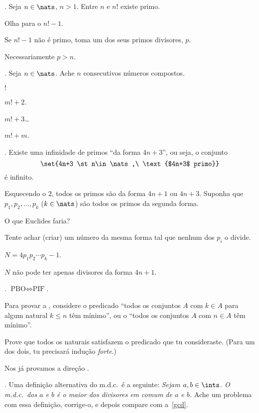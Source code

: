 \endproblem

\problem.
Seja $n\in\nats$, $n>1$.
Entre $n$ e $n!$ existe primo.

\hint
Olha para o $n!-1$.

\hint
Se $n!-1$ não é primo, toma um dos seus primos divisores, $p$.

\hint
Necessariamente $p > n$.

\endproblem

\problem.
Seja $n\in\nats$.
Ache $n$ consecutivos números compostos.

\hint
$!$

\hint
$m!+2$.

\hint
$m!+3$\dots

\hint
$m!+m$.

\endproblem

\problem.
Existe uma infinidade de primos ``da forma $4n+3$'', ou seja, o conjunto
$$
\set{4n+3 \st n\in\nats,\ \text{$4n+3$ primo}}
$$
é infinito.

\hint
Esquecendo o $2$, todos os primos são da forma $4n+1$ ou $4n+3$.
Suponha que $p_1, p_2,\dotsc, p_k$ ($k\in\nats$)
são todos os primos da segunda forma.

\hint
O que Euclides faria?

\hint
Tente achar (criar) um número da mesma forma tal que nenhum dos $p_i$ o divide.

\hint
$N = 4p_1p_2\dotsb p_k - 1$.

\hint
$N$ não pode ter apenas divisores da forma $4n+1$.

\endproblem

\problem.
$\text{PBO} \iff \text{PIF}$.

\hint
Para provar a \rldir, considere o predicado
``todos os conjuntos $A$ com $k\in A$ para algum natural $k\leq n$ têm mínimo'',
ou o ``todos os conjuntos $A$ com $n\in A$ têm mínimo''.

\hint
Prove que todos os naturais satisfazem o predicado que tu consideraste.
(Para um dos dois, tu precisará indução \emph{forte}.)

\solution
Nos já provamos a direção \lrdir.

\endproblem

.
\label{gcd_alternative_definition}
Uma definição alternativa do m.d.c.~é a seguinte:
{\it Sejam $a,b\in\ints$.
O m.d.c.~dos $a$ e $b$ é o maior dos divisores em comum de $a$ e $b$.}
Ache um problema com essa definição, corrige-o, e depois compare
com a~\ref{gcd}.

